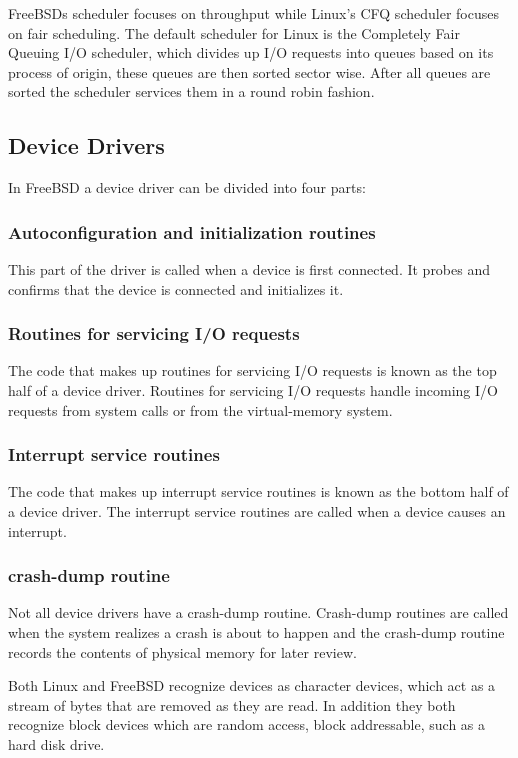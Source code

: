 \documentclass[letterpaper, 10pt, onecolumn, draftclsnofoot]{IEEEtran}
\begin{document}
FreeBSDs scheduler focuses on throughput while Linux's CFQ scheduler focuses on fair scheduling. The default scheduler for Linux is the Completely Fair Queuing I/O scheduler, which divides up I/O requests into queues based on its process of origin, these queues are then sorted sector wise. After all queues are sorted the scheduler services them in a round robin fashion.\cite{linux} 

\subsection{Device Drivers}
In FreeBSD a device driver can be divided into four parts:\cite{BSD}

\subsubsection{Autoconfiguration and initialization routines}
This part of the driver is called when a device is first connected. It probes and confirms that the device is connected and initializes it.\cite{BSD}

\subsubsection{Routines for servicing I/O requests}
The code that makes up routines for servicing I/O requests is known as the top half of a device driver. Routines for servicing I/O requests handle incoming I/O requests from system calls or from the virtual-memory system.\cite{BSD}

\subsubsection{Interrupt service routines}
The code that makes up interrupt service routines is known as the bottom half of a device driver. The interrupt service routines are called when a device causes an interrupt.\cite{BSD}

\subsubsection{crash-dump routine}
Not all device drivers have a crash-dump routine. Crash-dump routines are called when the system realizes a crash is about to happen and the crash-dump routine records the contents of physical memory for later review.\cite{BSD}

Both Linux and FreeBSD recognize devices as character devices, which act as a stream of bytes that are removed as they are read. In addition they both recognize block devices which are random access, block addressable, such as a hard disk drive.\cite{linux} 
\end{document}
